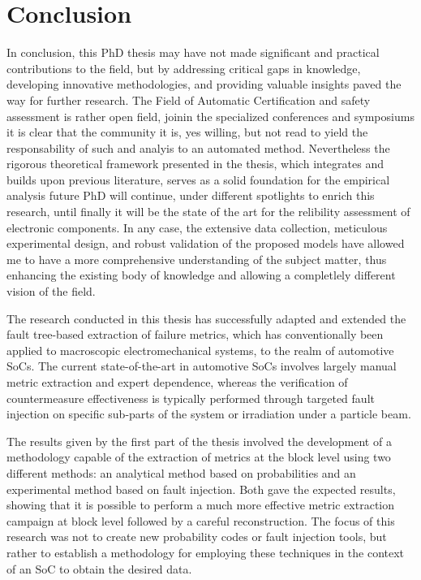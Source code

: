 \documentclass[./dissertation.tex]{subfiles}
\begin{document}
    \chapter{Conclusion}
In conclusion, this PhD thesis may have not made significant and practical contributions to the field, but by addressing critical gaps in knowledge, developing innovative methodologies, and providing valuable insights paved the way for further research. The Field of Automatic Certification and safety assessment is rather open field, joinin the specialized conferences and symposiums it is clear that the community it is, yes willing, but not read to yield the responsability of such and analyis to an automated method. Nevertheless the rigorous theoretical framework presented in the thesis, which integrates and builds upon previous literature, serves as a solid foundation for the empirical analysis future PhD will continue, under different spotlights to enrich this research, until finally it will be the state of the art for the relibility assessment of electronic components. In any case, the extensive data collection, meticulous experimental design, and robust validation of the proposed models have allowed me to have a more comprehensive understanding of the subject matter, thus enhancing the existing body of knowledge and allowing a completlely different vision of the field.


The research conducted in this thesis has successfully adapted and extended the fault tree-based extraction of failure metrics, which has conventionally been applied to macroscopic electromechanical systems, to the realm of automotive SoCs. The current state-of-the-art in automotive SoCs involves largely manual metric extraction and expert dependence, whereas the verification of countermeasure effectiveness is typically performed through targeted fault injection on specific sub-parts of the system or irradiation under a particle beam.

The results given by the first part of the thesis involved the development of a methodology capable of the extraction of metrics at the block level using two different methods: an analytical method based on probabilities and an experimental method based on fault injection. Both gave the expected results, showing that it is possible to perform a much more effective metric extraction campaign at block level followed by a careful reconstruction. The focus of this research was not to create new probability codes or fault injection tools, but rather to establish a methodology for employing these techniques in the context of an SoC to obtain the desired data.
\end{document}
